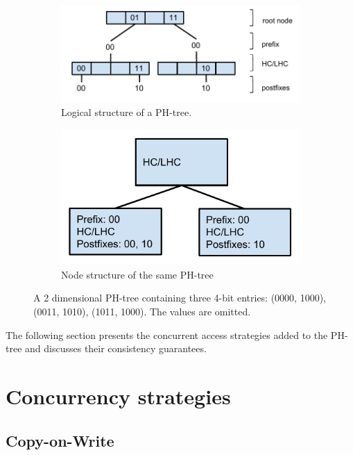 \documentclass[11pt,a4paper]{globis-book}
\begin{document}
\begin{figure}
    \centering
    \begin{subfigure}[b]{0.6\linewidth}
        \includegraphics[scale=0.7]{images/PH-tree-nodes}
        \caption{Logical structure of a PH-tree.}
        \label{fig:phtree-node-1}
    \end{subfigure}%
    \begin{subfigure}[b]{0.4\linewidth}
        \includegraphics[scale=0.7]{images/PH-tree-nodes-2}
        \caption{Node structure of the same PH-tree}
        \label{fig:phtree-node-2}
    \end{subfigure}
    \label{fig:phtree-nodes}
    \caption{A 2 dimensional PH-tree containing three 4-bit entries: (0000, 1000), (0011, 1010), (1011, 1000). The values are omitted. }
\end{figure}

The following section presents the concurrent access strategies added to the PH-tree and discusses their consistency guarantees.
\section{Concurrency strategies}

\subsection{Copy-on-Write}
\end{document}
